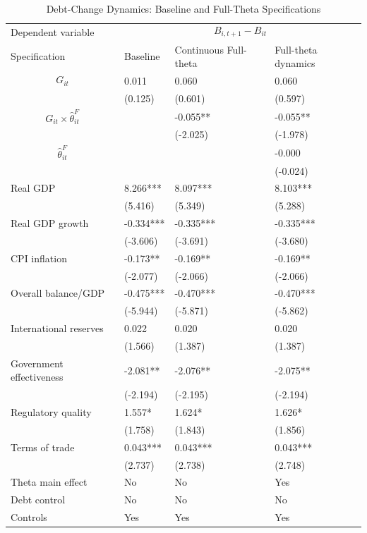 \begin{table}[H]\centering
\begin{threeparttable}
\caption{Debt-Change Dynamics: Baseline and Full-Theta Specifications}
\label{tab:debt_change_combined_fulltheta}
\scriptsize
\begin{tabularx}{\textwidth}{lYYY}
\toprule
Dependent variable &  \\
\cmidrule(lr){2-4}
Specification & Baseline & Continuous Full-theta & Full-theta dynamics \\
\midrule
$$G_{it}$$ & 0.011 & 0.060 & 0.060 \\
 & (0.125) & (0.601) & (0.597) \\
$$G_{it}\times\widehat{\theta}^{F}_{it}$$ &  & -0.055** & -0.055** \\
 &  & (-2.025) & (-1.978) \\
$$\widehat{\theta}^{F}_{it}$$ &  &  & -0.000 \\
 &  &  & (-0.024) \\
Real GDP & 8.266*** & 8.097*** & 8.103*** \\
 & (5.416) & (5.349) & (5.288) \\
Real GDP growth & -0.334*** & -0.335*** & -0.335*** \\
 & (-3.606) & (-3.691) & (-3.680) \\
CPI inflation & -0.173** & -0.169** & -0.169** \\
 & (-2.077) & (-2.066) & (-2.066) \\
Overall balance/GDP & -0.475*** & -0.470*** & -0.470*** \\
 & (-5.944) & (-5.871) & (-5.862) \\
International reserves & 0.022 & 0.020 & 0.020 \\
 & (1.566) & (1.387) & (1.387) \\
Government effectiveness & -2.081** & -2.076** & -2.075** \\
 & (-2.194) & (-2.195) & (-2.194) \\
Regulatory quality & 1.557* & 1.624* & 1.626* \\
 & (1.758) & (1.843) & (1.856) \\
Terms of trade & 0.043*** & 0.043*** & 0.043*** \\
 & (2.737) & (2.738) & (2.748) \\
\midrule
Theta main effect & No & No & Yes \\
Debt control & No & No & No \\
Controls & Yes & Yes & Yes \\

\end{tabularx}
\end{threeparttable}
\end{table}
